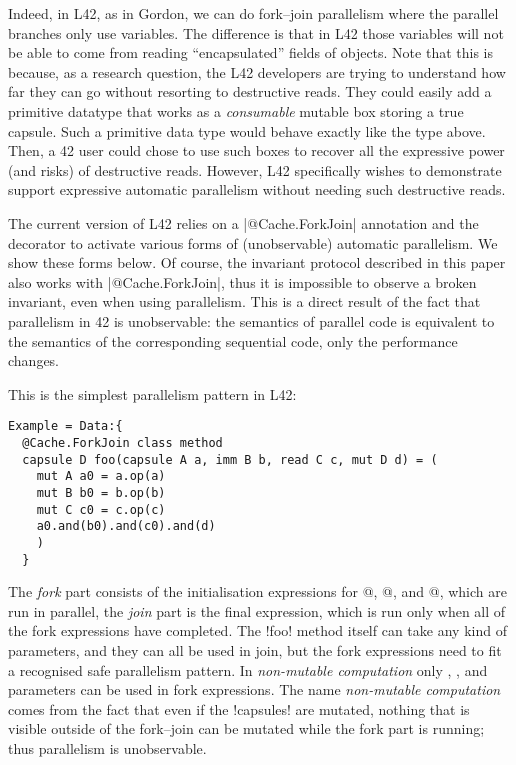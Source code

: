 Indeed, in L42, as in Gordon, we can do fork--join parallelism where the parallel branches only use \Q@capsule@ variables.
The difference is that in L42 those variables will not be able to come from reading ``encapsulated'' fields of \Q@mut@ objects.
Note that this is because, as a research question, the L42 developers are trying to understand how far they can go without resorting to destructive reads.
They could easily add a primitive datatype that works as a \emph{consumable} mutable box storing a true capsule. Such a primitive data type would behave exactly like the \Q@Box@ type above.
Then, a 42 user could chose to use such boxes to recover all the expressive power (and risks) of destructive reads.
However, L42 specifically wishes to demonstrate support expressive automatic parallelism without needing such destructive reads.

The current version of L42 relies on a \Q|@Cache.ForkJoin| annotation and the \Q@Data@ decorator to activate various forms of (unobservable) automatic parallelism. We show these forms below.
Of course, the invariant protocol described in this paper also works with \Q|@Cache.ForkJoin|, thus it is impossible to observe a broken invariant, even when using parallelism. This is a direct result of the fact that parallelism in 42 is unobservable: the semantics of parallel code is equivalent to the semantics of the corresponding sequential code, only the performance changes.


This is the simplest parallelism pattern in L42:
\begin{lstlisting}[deletekeywords=label]
Example = Data:{
  @Cache.ForkJoin class method 
  capsule D foo(capsule A a, imm B b, read C c, mut D d) = (
    mut A a0 = a.op(a)
    mut B b0 = b.op(b)
    mut C c0 = c.op(c)
    a0.and(b0).and(c0).and(d)
    )
  }
\end{lstlisting}
The \emph{fork} part consists of the initialisation expressions for @, @, and 
@, which are run in parallel, the \emph{join} part is the final expression, which is run only when 
all of the fork expressions have completed.
The \Q!foo! method itself can take any kind of parameters, and they can all be used in join, but the fork expressions need to fit a recognised
safe parallelism pattern. In \emph{non-mutable computation} only \Q@read@, \Q@capsule@, and \Q@imm@ parameters can be used in fork expressions.
The name \emph{non-mutable computation} comes from the fact that even if the \Q!capsules! are mutated, nothing that is visible outside of the fork--join can be mutated while the fork part is running; thus parallelism is unobservable.

